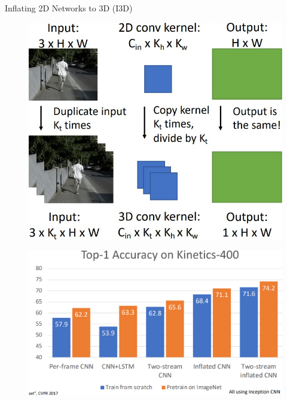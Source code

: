 \begin{frame}[allowframebreaks]{Inflating 2D Networks to 3D (I3D)}
\begin{figure}
        \includegraphics[width=1\textwidth,height=0.9\textheight,keepaspectratio]{images/video/slide_36_1_img.jpg}
    \end{figure}
\framebreak
    \begin{figure}
        \centering
        \includegraphics[width=1\textwidth,height=0.9\textheight,keepaspectratio]{images/video/slide_37_1_img.png}
    \end{figure}
\end{frame}